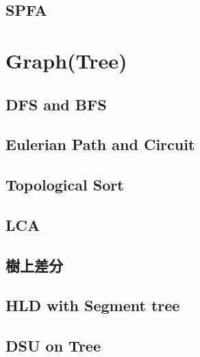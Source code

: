 %

\subsection{SPFA}


\section{Graph(Tree)}

\subsection{DFS and BFS}


\subsection{Eulerian Path and Circuit}


\subsection{Topological Sort}


\subsection{LCA}


\subsection{樹上差分}


\subsection{HLD with Segment tree}


\subsection{DSU on Tree}


